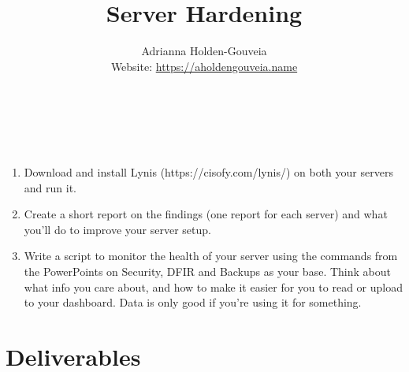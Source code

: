 \documentclass[12pt]{article}
\title{Server Hardening}
\author{
        Adrianna Holden-Gouveia \\
        Website: \url{https://aholdengouveia.name}\\ 
        \date{\vspace{-5ex}}
        \faLinkedin{: aholdengouveia} \\
        \faGithub {: aholdengouveia} \\
        }
\begin{document}
    

\maketitle


 
    \begin{enumerate}
        \item Download and install Lynis (https://cisofy.com/lynis/) on both your servers and run it.
        \item Create a short report on the findings (one report for each server) and what you'll do to improve your server setup.
        \item Write a script to monitor the health of your server using the commands from the PowerPoints on Security, DFIR and Backups as your base. Think about what info you care about, and how to make it easier for you to read or upload to your dashboard.  Data is only good if you're using it for something. 
    \end{enumerate}



\section*{Deliverables}
\end{document}
